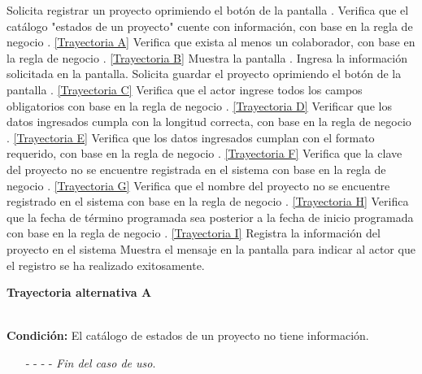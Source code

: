 	\begin{UCtrayectoria}
		\UCpaso[\UCactor] Solicita registrar un proyecto oprimiendo el botón  de la pantalla .
		\UCpaso[\UCsist] Verifica que el catálogo "estados de un proyecto" cuente con información, con base en la regla de negocio . \hyperlink{CU2-1:TAA}{[Trayectoria A]}
		\UCpaso[\UCsist] Verifica que exista al menos un colaborador, con base en la regla de negocio . \hyperlink{CU2-1:TAB}{[Trayectoria B]}
		\UCpaso[\UCsist] Muestra la pantalla .
		\UCpaso[\UCactor] Ingresa la información solicitada en la pantalla. \label{CU2.1-P5}
		\UCpaso[\UCactor] Solicita guardar el proyecto oprimiendo el botón  de la pantalla . \hyperlink{CU2-1:TAC}{[Trayectoria C]}
		\UCpaso[\UCsist] Verifica que el actor ingrese todos los campos obligatorios con base en la regla de negocio . \hyperlink{CU2-1:TAD}{[Trayectoria D]}
		\UCpaso[\UCsist] Verificar que los datos ingresados cumpla con la longitud correcta, con base en la regla de negocio . \hyperlink{CU2-1:TAE}{[Trayectoria E]}
		\UCpaso[\UCsist] Verifica que los datos ingresados cumplan con el formato requerido, con base en la regla de negocio . \hyperlink{CU2-1:TAF}{[Trayectoria F]}
		\UCpaso[\UCsist] Verifica que la clave del proyecto no se encuentre registrada en el sistema con base en la regla de negocio . \hyperlink{CU2-1:TAG}{[Trayectoria G]}
		\UCpaso[\UCsist] Verifica que el nombre del proyecto no se encuentre registrado en el sistema con base en la regla de negocio . \hyperlink{CU2-1:TAH}{[Trayectoria H]}
		\UCpaso[\UCsist] Verifica que la fecha de término programada sea posterior a la fecha de inicio programada con base en la regla de negocio . \hyperlink{CU2-1:TAI}{[Trayectoria I]}
		\UCpaso[\UCsist] Registra la información del proyecto en el sistema
		\UCpaso[\UCsist] Muestra el mensaje  en la pantalla  para indicar al actor que el registro se ha realizado exitosamente.
	\end{UCtrayectoria}		
\hypertarget{CU2-1:TAA}{\textbf{Trayectoria alternativa A}}\\
\noindent \textbf{Condición:} El catálogo de estados de un proyecto no tiene información.
\begin{enumerate}
	\UCpaso[\UCsist] Muestra el mensaje  en la pantalla  para indicar que no es posible realizar la operación debido a la falta de información necesaria para el sistema.
	\item[- -] - - {\em {Fin del caso de uso}}.%
\end{enumerate}

